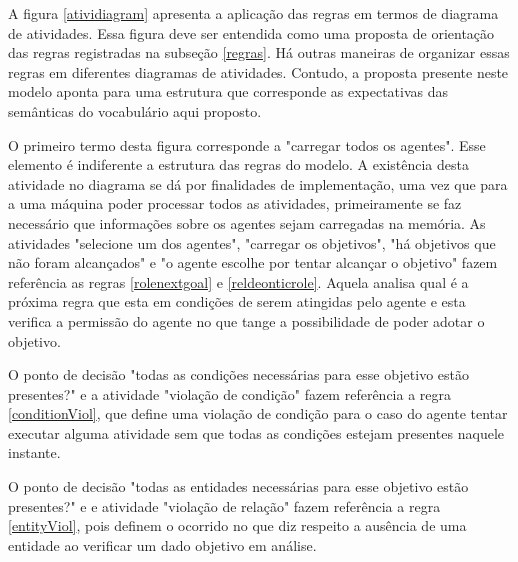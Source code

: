 A figura \ref{atividiagram} apresenta a aplicação das regras em termos de diagrama de atividades. Essa figura deve ser entendida como uma proposta de orientação das regras registradas na subseção \ref{regras}. Há outras maneiras de organizar essas regras em diferentes diagramas de atividades. Contudo, a proposta presente neste modelo aponta para uma estrutura que corresponde as expectativas das semânticas do vocabulário aqui proposto.

O primeiro termo desta figura corresponde a "carregar todos os agentes". Esse elemento é indiferente a estrutura das regras do modelo. A existência desta atividade no diagrama se dá por finalidades de implementação, uma vez que para a uma máquina poder processar todos as atividades, primeiramente se faz necessário que informações sobre os agentes sejam carregadas na memória. As atividades "selecione um dos agentes", "carregar os objetivos", "há objetivos que não foram alcançados" e "o agente escolhe por tentar alcançar o objetivo" fazem referência as regras \ref{rolenextgoal} e \ref{reldeonticrole}. Aquela analisa qual é a próxima regra que esta em condições de serem atingidas pelo agente e esta verifica a permissão do agente no que tange a possibilidade de poder adotar o objetivo. 

O ponto de decisão "todas as condições necessárias para esse objetivo estão presentes?" e a atividade "violação de condição" fazem referência a regra \ref{conditionViol}, que define uma violação de condição para o caso do agente tentar executar alguma atividade sem que todas as condições estejam presentes naquele instante.

O ponto de decisão "todas as entidades necessárias para esse objetivo estão presentes?" e e atividade "violação de relação" fazem referência a regra \ref{entityViol}, pois definem o ocorrido no que diz respeito a ausência de uma entidade ao verificar um dado objetivo em análise. 

